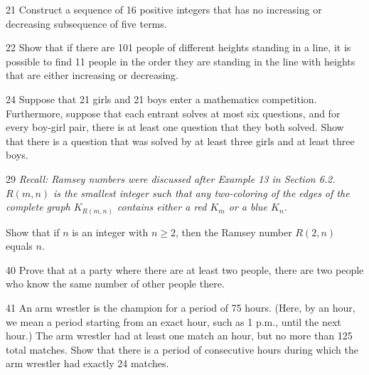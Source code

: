 \documentclass[11pt]{article}
\begin{document}
\begin{exercise}{21}
    Construct a sequence of 16 positive integers that has no
    increasing or decreasing subsequence of five terms.
\end{exercise}

\begin{exercise}{22}
    Show that if there are 101 people of different heights standing
    in a line, it is possible to find 11 people in the order they are
    standing in the line with heights that are either increasing or
    decreasing.
\end{exercise}

\begin{exercise}{24}
    Suppose that 21 girls and 21 boys enter a mathematics competition.
    Furthermore, suppose that each entrant solves at most six
    questions, and for every boy-girl pair, there is at least one
    question that they both solved. Show that there is a question
    that was solved by at least three girls and at least three boys.
\end{exercise}

\begin{exercise}{29}
    \textit{Recall: Ramsey numbers were discussed after Example 13 in
    Section 6.2. $R(m,n)$ is the smallest integer such that any
    two-coloring of the edges of the complete graph $K_{R(m,n)}$
    contains either a red $K_m$ or a blue $K_n$.}

    Show that if $n$ is an integer with $n \geq 2$, then the Ramsey
    number $R(2,n)$ equals $n$.
\end{exercise}

\begin{exercise}{40}
    Prove that at a party where there are at least two people, there
    are two people who know the same number of other people there.
\end{exercise}

\begin{exercise}{41}
    An arm wrestler is the champion for a period of 75 hours. (Here,
    by an hour, we mean a period starting from an exact hour, such as
    1 p.m., until the next hour.) The arm wrestler had at least one
    match an hour, but no more than 125 total matches. Show that
    there is a period of consecutive hours during which the arm
    wrestler had exactly 24 matches.
\end{exercise}
\end{document}
